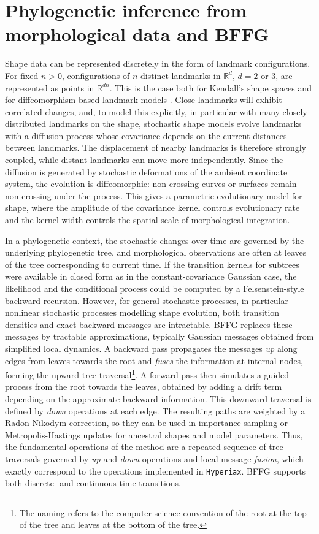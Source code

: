 \documentclass[unnumsec,webpdf,contemporary,large]{oup-authoring-template}
\newcommand{\Hyperiax}{\texttt{Hyperiax}}
\begin{document}
\section{Phylogenetic inference from morphological data and BFFG}
Shape data can be represented discretely in the form of landmark configurations. For fixed $n>0$, configurations of $n$ distinct landmarks in $\mathbb{R}^d$, $d=2$ or $3$, are represented as points in $\mathbb{R}^{dn}$. This is the case both for Kendall's shape spaces \citep{kendall1984shape} and for diffeomorphism-based landmark models \citep{joshi2000landmark}. Close landmarks will exhibit correlated changes, and, to model this explicitly, in particular with many closely distributed landmarks on the shape, stochastic shape models \citep{stroustrup2026stochastic,sommer2026stochastics} evolve landmarks with a diffusion process whose covariance depends on the current distances between landmarks. The displacement of nearby landmarks is therefore strongly coupled, while distant landmarks can move more independently. Since the diffusion is generated by stochastic deformations of the ambient coordinate system, the evolution is diffeomorphic: non-crossing curves or surfaces remain non-crossing under the process. This gives a parametric evolutionary model for shape, where the amplitude of the covariance kernel controls evolutionary rate and the kernel width controls the spatial scale of morphological integration.

In a phylogenetic context, the stochastic changes over time are governed by the underlying phylogenetic tree, and morphological observations are often at leaves of the tree corresponding to current time. If the transition kernels for subtrees were available in closed form as in the constant-covariance Gaussian case, the likelihood and the conditional process could be computed by a Felsenstein-style backward recursion. However, for general stochastic processes, in particular nonlinear stochastic processes modelling shape evolution, both transition densities and exact backward messages are intractable. BFFG \citep{vandermeulen2025backward} replaces these messages by tractable approximations, typically Gaussian messages obtained from simplified local dynamics. A backward pass propagates the messages \emph{up} along edges from leaves towards the root and \emph{fuses} the information at internal nodes, forming the upward tree traversal\footnote{The naming refers to the computer science convention of the root at the top of the tree and leaves at the bottom of the tree.}. A forward pass then simulates a guided process from the root towards the leaves, obtained by adding a drift term depending on the approximate backward information. This downward traversal is defined by \emph{down} operations at each edge. The resulting paths are weighted by a Radon-Nikodym correction, so they can be used in importance sampling or Metropolis-Hastings updates for ancestral shapes and model parameters. Thus, the fundamental operations of the method are a repeated sequence of tree traversals governed by \emph{up} and \emph{down} operations and local message \emph{fusion}, which exactly correspond to the operations implemented in \Hyperiax. BFFG supports both discrete- and continuous-time transitions.
\end{document}
